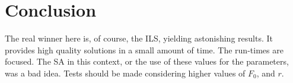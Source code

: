 \section{Conclusion}

The real winner here is, of course, the ILS, yielding astonishing results. It provides high quality solutions in a small amount of time. The run-times are focused. The SA in this context, or the use of these values for the parameters, was a bad idea. Tests should be made considering higher values of $F_0$, and $r$.


